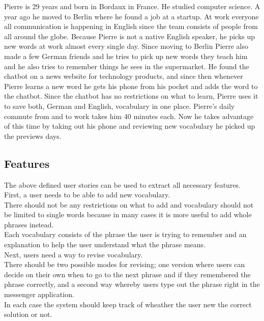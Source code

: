 Pierre is 29 years and born in Bordaux in France.
He studied computer science.
A year ago he moved to Berlin where he found a job at a startup.
At work everyone all communication is happening in English since the team consists of people from all around the globe.
Because Pierre is not a native English speaker, he picks up new words at work almost every single day.
Since moving to Berlin Pierre also made a few German friends and he tries to pick up new words they teach him
and he also tries to remember things he sees in the supermarket.
He found the chatbot on a news website for technology products,
and since then whenever Pierre learns a new word he gets his phone from his pocket and adds the word to the chatbot.
Since the chatbot has no restrictions on what to learn, Pierre uses it to save both, German and English, vocabulary in one place.
Pierre's daily commute from and to work takes him 40 minutes each.
Now he takes advantage of this time by taking out his phone and reviewing new vocabulary he picked up the previews days.
\\


\subsection{Features}

The above defined user stories can be used to extract all necessary features.
\\

First, a user needs to be able to add new vocabulary.
\\
There should not be any restrictions on what to add
and vocabulary should not be limited to single words because in many cases it is more useful
to add whole phrases instead.
\\
Each vocabulary consists of the phrase the user is trying to remember
and an explanation to help the user understand what the phrase means.
\\

Next, users need a way to revise vocabulary.
\\
There should be two possible modes for revising;
one version where users can decide on their own when to go to the next phrase
and if they remembered the phrase correctly,
and a second way whereby users type out the phrase right in the messenger application.
\\
In each case the system should keep track of wheather the user new the correct solution or not.
\\

